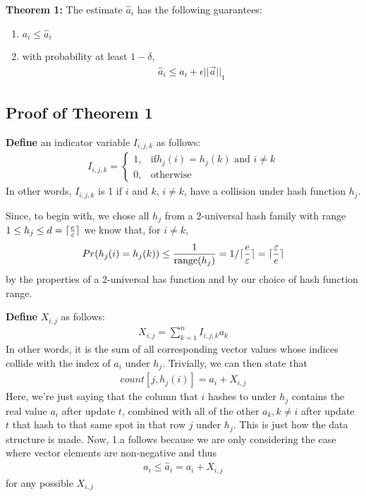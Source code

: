 \documentclass[11pt]{article}
\DeclarePairedDelimiter\ceil{\lceil}{\rceil}
\begin{document}
\textbf{Theorem 1:} The estimate $\hat a_i$ has the following guarantees:
\begin{enumerate}[label=\textnormal{(\arabic*)}]
    \item $a_i \leq \hat{a}_i$
    \item with probability at least $1 - \delta$, 
    \begin{align}
        \hat{a}_i \leq a_i + \epsilon ||\vec{a}||_1 
    \end{align}
\end{enumerate}
\subsection{Proof of Theorem 1}
\textbf{Define} an indicator variable $I_{i, j, k}$ as follows:
\begin{align}
    I_{i, j, k} = 
    \begin{cases}
        1, & \text{if} h_j(i) = h_j(k) \text{ and } i \neq k \\
        0, & \text{otherwise}
    \end{cases}
\end{align}
In other words, $I_{i, j, k}$ is 1 if $i$ and $k$, $i \neq k$, have
a collision under hash function $h_j$.

Since, to begin with, we chose all $h_j$ from a 2-universal hash family
with range $1 \leq h_j \leq d = \ceil{\frac{e}{\varepsilon}}$ 
we know that, for $i \neq k$,
\begin{align}\label{eq:collision-prob}
    Pr(h_j(i) = h_j(k)) \leq \frac{1}{\text{range}(h_j)} = 1/\ceil{\frac{e}{\varepsilon}} = \ceil{\frac{\varepsilon}{e}}
\end{align}
by the properties of a 2-universal has function and by our choice of hash function
range.

\textbf{Define} $X_{i, j}$ as follows:
\begin{align}
    X_{i, j} = \sum_{k = 1}^{n}I_{i, j, k} a_k
\end{align}
In other words, it is the sum of all corresponding vector values whose indices
collide with the index of $a_i$ under $h_j$. Trivially, we can then state that
\begin{align}\label{eq:count-def}
    count[j, h_j(i)] = a_i + X_{i, j} 
\end{align}
Here, we're just saying that the column that $i$ hashes to under $h_j$
contains the real value $a_i$ after update $t$, combined with all of the other
$a_k, k \neq i$ after update $t$ that hash to that same spot in that row $j$ under
$h_j$. This is just how the data structure is made.  Now, 1.a follows because
we are only considering the case where vector elements are non-negative and thus
\begin{align}
    a_i \leq \hat a_i = a_i + X_{i, j}
\end{align}
for any possible $X_{i, j}$
\end{document}
